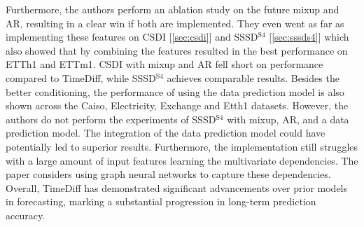 Furthermore, the authors perform an ablation study on the future mixup and AR, resulting in a clear win if both are implemented. They even went as far as implementing these features on CSDI [\ref{sec:csdi}] and SSSD$^{\text{S4}}$ [\ref{sec:sssds4}] which also showed that by combining the features resulted in the best performance on ETTh1 and ETTm1. CSDI with mixup and AR fell short on performance compared to TimeDiff, while SSSD$^{\text{S4}}$ achieves comparable results.
Besides the better conditioning, the performance of using the data prediction model is also shown across the Caiso, Electricity, Exchange and Etth1 datasets. 
However, the authors do not perform the experiments of SSSD$^{\text{S4}}$ with mixup, AR, and a data prediction model. The integration of the data prediction model could have potentially led to superior results.
Furthermore, the implementation still struggles with a large amount of input features learning the multivariate dependencies. The paper considers using graph neural networks to capture these dependencies.
Overall, TimeDiff has demonstrated significant advancements over prior models in forecasting, marking a substantial progression in long-term prediction accuracy.